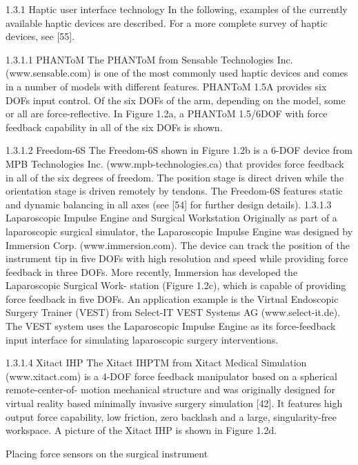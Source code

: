 1.3.1 Haptic user interface technology
In the following, examples of the currently available haptic devices are 
described. For a more complete survey of haptic devices, see [55]. 

1.3.1.1 PHANToM 
The PHANToM from Sensable Technologies Inc. (www.sensable.com) is one of the most commonly used haptic devices and comes in a number of models with different features. PHANToM 1.5A provides six DOFs input control. Of the six DOFs of the arm, depending on the model, some or all are force-reflective. In Figure 1.2a, a PHANToM 1.5/6DOF with force feedback capability in all of the six DOFs is shown. 

1.3.1.2 Freedom-6S 
The Freedom-6S shown in Figure 1.2b is a 6-DOF device from MPB Technologies Inc. (www.mpb-technologies.ca) that provides force feedback in all of the six degrees of freedom. The position stage is direct driven while the orientation stage is driven remotely by tendons. The Freedom-6S features static and dynamic balancing in all axes (see [54] for further design details). 
1.3.1.3 Laparoscopic Impulse Engine and Surgical Workstation 
Originally as part of a laparoscopic surgical simulator, the Laparoscopic Impulse Engine was designed by Immersion Corp. (www.immersion.com). The device can track the position of the instrument tip in five DOFs with high resolution and speed while providing force feedback in three DOFs. More recently, Immersion has developed the Laparoscopic Surgical Work- station (Figure 1.2c), which is capable of providing force feedback in five DOFs. An application example is the Virtual Endoscopic Surgery Trainer (VEST) from Select-IT VEST Systems AG (www.select-it.de). The VEST system uses the Laparoscopic Impulse Engine as its force-feedback input interface for simulating laparoscopic surgery interventions. 

1.3.1.4 Xitact IHP 
The Xitact IHPTM from Xitact Medical Simulation (www.xitact.com) is a 4-DOF force feedback manipulator based on a spherical remote-center-of- motion mechanical structure and was originally designed for virtual reality based minimally invasive surgery simulation [42]. It features high output force capability, low friction, zero backlash and a large, singularity-free workspace. A picture of the Xitact IHP is shown in Figure 1.2d. 



Placing force sensors on the surgical instrument \cite{hong_design_2012}

